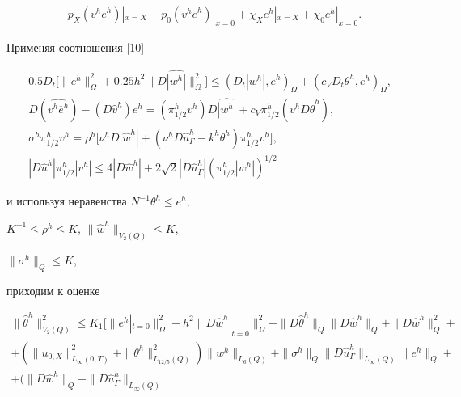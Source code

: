\begin{pf}
\begin{multline*}
-p_X(v^h\overline e^h)|_{x=X}+p_0(v^h\overline e^h)|_{x=0}


+\chi_Xe^h|_{x=X}+\chi_0e^h|_{x=0}.


\end{multline*}


Применяя соотношения [10]


\begin{gather*}


0.5D_t\big[\|e^h\|^2_\Omega+0.25h^2\|D\widehat {|w^h|}\|_{\Omega}^2\big]


\le (D_t|w^h|,\overline e^h)_\Omega+(c_VD_t\theta^h,e^h)_\Omega,\\


D(\widehat{v^h\overline e^h})-(D\widehat v^h)e^h=


(\pi^h_{1/2}v^h)D\widehat {|w^h|} +c_V\pi^h_{1/2}(v^hD\widehat\theta^h),\\


\sigma^h\pi^h_{1/2}v^h=\rho^h\big[\nu^h D{|\widehat w^h|}+


(\nu^h D\widehat u^h_{\Gamma}-k^h\theta^h)\pi^h_{1/2}v^h\big],\\


|D\widehat u^h|\pi^h_{1/2}|v^h|\le


4|D\widehat w^h|+2\sqrt{2}|D\widehat u^h_\Gamma|(\pi^h_{1/2}|w^h|)^{1/2}


\end{gather*}


и используя неравенства $N^{-1}\theta^h\le e^h$,


$K^{-1}\le\rho^h\le K$, $\|\widehat w^h\|_{V_2(Q)}\le K$,


$\|\sigma^h\|_Q\le K$,


приходим к оценке


\begin{multline*}


\|\widehat\theta^h\|_{V_2(Q)}^2\le


K_1\big[\|e^h|_{t=0}\|^2_\Omega+h^2\|D\widehat w^h|_{t=0}\|_\Omega^2+


\|D\widehat\theta^h\|_Q\|D\widehat w^h\|_Q+\|D\widehat w^h\|_Q^2+\\


+(\|u_{0,X}\|^2_{L_\infty(0,T)}+\|\theta^h\|_{L_{12/5}(Q)}^2)\|w^h\|_{L_6(Q)}


+\|\sigma^h\|_Q\|D\widehat u^h_\Gamma\|_{L_{\infty}(Q)}\|e^h\|_Q+\\


+(\|D\widehat w^h\|_Q+\|D\widehat u^h_{\Gamma}\|_{L_\infty(Q)}



\end{multline*}
\end{pf}
